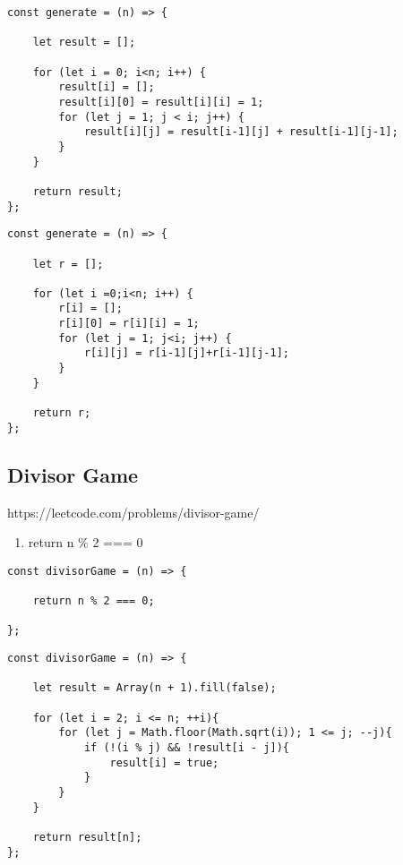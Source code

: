 \documentclass[10pt]{article}
\begin{document}
\begin{lstlisting}[title=Solution generate, captionpos=t]
const generate = (n) => {
    
    let result = [];
    
    for (let i = 0; i<n; i++) {
        result[i] = [];
        result[i][0] = result[i][i] = 1;
        for (let j = 1; j < i; j++) {
            result[i][j] = result[i-1][j] + result[i-1][j-1];
        }
    }
    
    return result;
};
\end{lstlisting}

\begin{lstlisting}[title=Solution generate with less mess, captionpos=t]
const generate = (n) => {
    
    let r = [];
    
    for (let i =0;i<n; i++) {
        r[i] = [];
        r[i][0] = r[i][i] = 1;
        for (let j = 1; j<i; j++) {
            r[i][j] = r[i-1][j]+r[i-1][j-1];
        }
    } 
    
    return r;
};
\end{lstlisting}
\medskip %








\pagebreak %
\medskip   
\subsection{Divisor Game}
https://leetcode.com/problems/divisor-game/

\begin{enumerate}
	\item return n \% 2 === 0 
\end{enumerate}

\begin{lstlisting}[title=Solution divisorGame, captionpos=t]
const divisorGame = (n) => {

    return n % 2 === 0;
    
};
\end{lstlisting}


\begin{lstlisting}[title=Solution divisorGame, captionpos=t]
const divisorGame = (n) => {
    
    let result = Array(n + 1).fill(false);
    
    for (let i = 2; i <= n; ++i){
        for (let j = Math.floor(Math.sqrt(i)); 1 <= j; --j){
            if (!(i % j) && !result[i - j]){
                result[i] = true;
            }
        }
    }
   
    return result[n];
};
\end{lstlisting}
\end{document}
